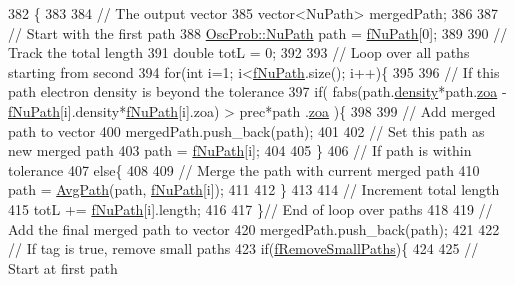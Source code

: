 \begin{DoxyCode}
382                                                    \{
383 
384   \textcolor{comment}{// The output vector}
385   vector<NuPath> mergedPath;
386 
387   \textcolor{comment}{// Start with the first path}
388   \hyperlink{structOscProb_1_1NuPath}{OscProb::NuPath} path = \hyperlink{classOscProb_1_1PremModel_aaf3c77e35798d664853157013c90ad2b}{fNuPath}[0];
389 
390   \textcolor{comment}{// Track the total length}
391   \textcolor{keywordtype}{double} totL = 0;
392 
393   \textcolor{comment}{// Loop over all paths starting from second}
394   \textcolor{keywordflow}{for}(\textcolor{keywordtype}{int} i=1; i<\hyperlink{classOscProb_1_1PremModel_aaf3c77e35798d664853157013c90ad2b}{fNuPath}.size(); i++)\{
395 
396     \textcolor{comment}{// If this path electron density is beyond the tolerance}
397     \textcolor{keywordflow}{if}( fabs(path.\hyperlink{structOscProb_1_1NuPath_a54ddd451db69bc54434de3cf18a117ca}{density}*path.\hyperlink{structOscProb_1_1NuPath_af3213f3691ba83c6bc05f4a3490f6b31}{zoa} - \hyperlink{classOscProb_1_1PremModel_aaf3c77e35798d664853157013c90ad2b}{fNuPath}[i].density*\hyperlink{classOscProb_1_1PremModel_aaf3c77e35798d664853157013c90ad2b}{fNuPath}[i].zoa) > prec*path
      .\hyperlink{structOscProb_1_1NuPath_af3213f3691ba83c6bc05f4a3490f6b31}{zoa} )\{
398 
399       \textcolor{comment}{// Add merged path to vector}
400       mergedPath.push\_back(path);
401       
402       \textcolor{comment}{// Set this path as new merged path}
403       path = \hyperlink{classOscProb_1_1PremModel_aaf3c77e35798d664853157013c90ad2b}{fNuPath}[i];
404 
405     \}
406     \textcolor{comment}{// If path is within tolerance}
407     \textcolor{keywordflow}{else}\{
408       
409       \textcolor{comment}{// Merge the path with current merged path}
410       path = \hyperlink{classOscProb_1_1PremModel_a646977424cdca178a77694397146c2f8}{AvgPath}(path, \hyperlink{classOscProb_1_1PremModel_aaf3c77e35798d664853157013c90ad2b}{fNuPath}[i]);
411 
412     \}
413 
414     \textcolor{comment}{// Increment total length}
415     totL += \hyperlink{classOscProb_1_1PremModel_aaf3c77e35798d664853157013c90ad2b}{fNuPath}[i].length;
416 
417   \}\textcolor{comment}{// End of loop over paths}
418 
419   \textcolor{comment}{// Add the final merged path to vector}
420   mergedPath.push\_back(path);
421 
422   \textcolor{comment}{// If tag is true, remove small paths}
423   \textcolor{keywordflow}{if}(\hyperlink{classOscProb_1_1PremModel_a3973df6f5f2ff219cd2f865b31aacfd2}{fRemoveSmallPaths})\{
424 
425     \textcolor{comment}{// Start at first path}

\end{DoxyCode}
